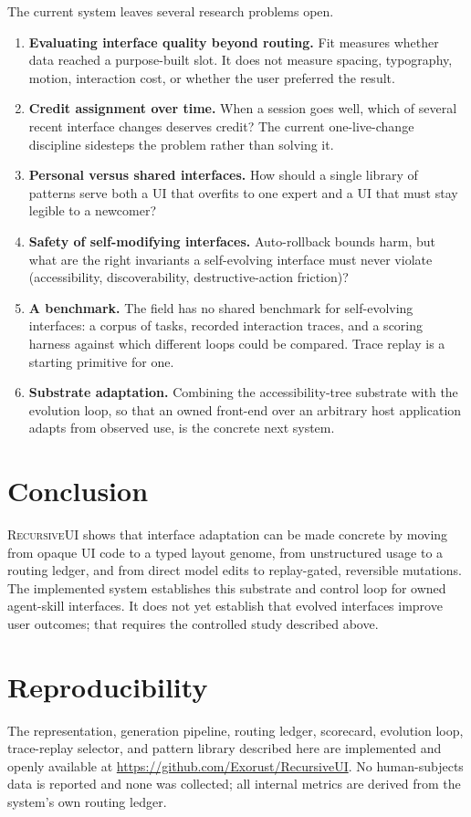 \documentclass[11pt]{article}
\begin{document}
The current system leaves several research problems open.
\begin{enumerate}[leftmargin=1.5em,itemsep=2pt]
  \item \textbf{Evaluating interface quality beyond routing.} Fit measures
  whether data reached a purpose-built slot. It does not measure spacing,
  typography, motion, interaction cost, or whether the user preferred the result.
  \item \textbf{Credit assignment over time.} When a session goes well, which of
  several recent interface changes deserves credit? The current one-live-change
  discipline sidesteps the problem rather than solving it.
  \item \textbf{Personal versus shared interfaces.} How should a single library of
  patterns serve both a UI that overfits to one expert and a UI that must stay
  legible to a newcomer?
  \item \textbf{Safety of self-modifying interfaces.} Auto-rollback bounds harm,
  but what are the right invariants a self-evolving interface must never violate
  (accessibility, discoverability, destructive-action friction)?
  \item \textbf{A benchmark.} The field has no shared benchmark for self-evolving
  interfaces: a corpus of tasks, recorded interaction traces, and a scoring
  harness against which different loops could be compared. Trace replay is a
  starting primitive for one.
  \item \textbf{Substrate adaptation.} Combining the accessibility-tree substrate
  with the evolution loop, so that an owned front-end over an arbitrary host
  application adapts from observed use, is the concrete next system.
\end{enumerate}

\section{Conclusion}

\textsc{RecursiveUI} shows that interface adaptation can be made concrete by
moving from opaque UI code to a typed layout genome, from unstructured usage to a
routing ledger, and from direct model edits to replay-gated, reversible
mutations. The implemented system establishes this substrate and control loop for
owned agent-skill interfaces. It does not yet establish that evolved interfaces
improve user outcomes; that requires the controlled study described above.

\section*{Reproducibility}
The representation, generation pipeline, routing ledger, scorecard, evolution
loop, trace-replay selector, and pattern library described here are implemented
and openly available at \url{https://github.com/Exorust/RecursiveUI}. No
human-subjects data is reported and none was
collected; all internal metrics are derived from the system's own routing ledger.
\end{document}
